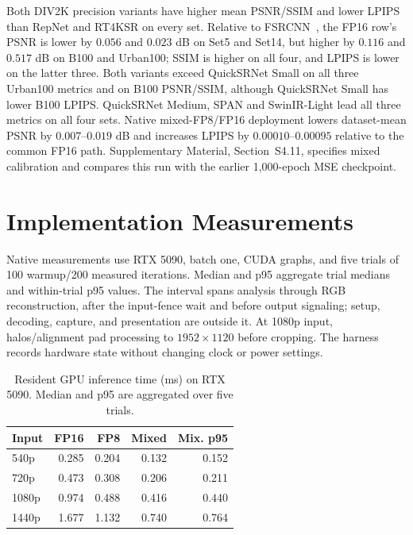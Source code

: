 \documentclass[10pt,twocolumn,letterpaper]{article}
\begin{document}


Both DIV2K precision variants have higher mean PSNR/SSIM and lower LPIPS than RepNet and RT4KSR on every set.
Relative to FSRCNN~\cite{dong2016fsrcnn}, the FP16 row's PSNR is lower by $0.056$ and $0.023$ dB on Set5 and Set14, but higher by $0.116$ and $0.517$ dB on B100 and Urban100; SSIM is higher on all four, and LPIPS is lower on the latter three.
Both variants exceed QuickSRNet Small on all three Urban100 metrics and on B100 PSNR/SSIM, although QuickSRNet Small has lower B100 LPIPS.
QuickSRNet Medium, SPAN and SwinIR-Light lead all three metrics on all four sets.
Native mixed-FP8/FP16 deployment lowers dataset-mean PSNR by $0.007$--$0.019$ dB and increases LPIPS by $0.00010$--$0.00095$ relative to the common FP16 path.
Supplementary Material, Section~S4.11, specifies mixed calibration and compares this run with the earlier 1,000-epoch MSE checkpoint.

\section{Implementation Measurements}
\label{sec:timing}
\label{sec:precision}
Native measurements use RTX 5090, batch one, CUDA graphs, and five trials of 100 warmup/200 measured iterations.
Median and p95 aggregate trial medians and within-trial p95 values.
The interval spans analysis through RGB reconstruction, after the input-fence wait and before output signaling; setup, decoding, capture, and presentation are outside it.
At 1080p input, halos/alignment pad processing to $1952\times1120$ before cropping.
The harness records hardware state without changing clock or power settings.

\begin{table}[h]
\centering\small
\caption{Resident GPU inference time (ms) on RTX 5090. Median and p95 are aggregated over five trials.}
\label{tab:latency}
\begin{tabularx}{\columnwidth}{Yrrrr}
\toprule
Input & FP16 & FP8 & Mixed & Mix. p95\\
\midrule
540p &0.285&0.204&0.132&0.152\\
720p &0.473&0.308&0.206&0.211\\
1080p &0.974&0.488&0.416&0.440\\
1440p &1.677&1.132&0.740&0.764\\
\bottomrule
\end{tabularx}
\end{table}
\end{document}
